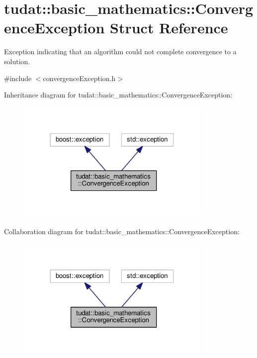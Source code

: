 \hypertarget{structtudat_1_1basic__mathematics_1_1ConvergenceException}{}\section{tudat\+:\+:basic\+\_\+mathematics\+:\+:Convergence\+Exception Struct Reference}
\label{structtudat_1_1basic__mathematics_1_1ConvergenceException}


Exception indicating that an algorithm could not complete convergence to a solution.  




{\ttfamily \#include $<$convergence\+Exception.\+h$>$}



Inheritance diagram for tudat\+:\+:basic\+\_\+mathematics\+:\+:Convergence\+Exception\+:
\nopagebreak
\begin{figure}[H]
\begin{center}
\leavevmode
\includegraphics[width=266pt]{structtudat_1_1basic__mathematics_1_1ConvergenceException__inherit__graph}
\end{center}
\end{figure}


Collaboration diagram for tudat\+:\+:basic\+\_\+mathematics\+:\+:Convergence\+Exception\+:
\nopagebreak
\begin{figure}[H]
\begin{center}
\leavevmode
\includegraphics[width=266pt]{structtudat_1_1basic__mathematics_1_1ConvergenceException__coll__graph}
\end{center}
\end{figure}
